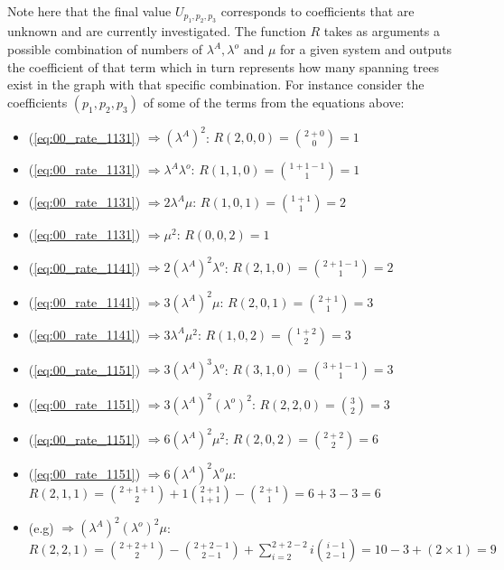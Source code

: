 Note here that the final value \(U_{p_1,p_2,p_3}\) corresponds to coefficients 
that are unknown and are currently investigated. 
The function \(R\) takes as arguments a possible combination of numbers of 
\(\lambda^A, \lambda^o \text{ and } \mu \) for a given system and outputs the 
coefficient of that term which in turn represents how many spanning trees exist 
in the graph with that specific combination. 
For instance consider the coefficients \((p_1,p_2,p_3)\) of some of the terms 
from the equations above:

\begin{multicols}{2}
    \begin{itemize}
        \item (\ref{eq:00_rate_1131}) \( \Rightarrow (\lambda^A)^2\): 
        \(R(2,0,0) = \binom{2+0}{0} = 1\)
        \item (\ref{eq:00_rate_1131}) \( \Rightarrow \lambda^A \lambda^o\): 
        \(R(1,1,0) = \binom{1+1-1}{1} = 1\)
        \item (\ref{eq:00_rate_1131}) \( \Rightarrow 2 \lambda^A \mu\): 
        \(R(1,0,1) = \binom{1+1}{1} = 2\)
        \item (\ref{eq:00_rate_1131}) \( \Rightarrow \mu^2\): \(R(0,0,2) = 1\)
        \item (\ref{eq:00_rate_1141}) \( \Rightarrow 2(\lambda^A)^2 \lambda^o\): 
        \(R(2,1,0) = \binom{2+1-1}{1} = 2\)
        \item (\ref{eq:00_rate_1141}) \( \Rightarrow 3(\lambda^A)^2 \mu\): 
        \(R(2,0,1) = \binom{2+1}{1} = 3\)
        \item (\ref{eq:00_rate_1141}) \( \Rightarrow 3 \lambda^A \mu^2\): 
        \(R(1,0,2) = \binom{1+2}{2} = 3\)
        \item (\ref{eq:00_rate_1151}) \( \Rightarrow 3 (\lambda^A)^3 \lambda^o\): 
        \(R(3,1,0) = \binom{3+1-1}{1} = 3\)
        \item (\ref{eq:00_rate_1151}) \( \Rightarrow 3 (\lambda^A)^2 (\lambda^o)^2 \): 
        \(R(2,2,0) = \binom{3}{2} = 3\)
        \item (\ref{eq:00_rate_1151}) \( \Rightarrow 6 (\lambda^A)^2 \mu ^ 2\): 
        \(R(2,0,2) = \binom{2+2}{2} = 6\)
    \end{itemize}
\end{multicols}

\begin{itemize}
    \item (\ref{eq:00_rate_1151}) \( \Rightarrow 6 (\lambda^A)^2 \lambda^o \mu\): 
    \(R(2,1,1) = \binom{2+1+1}{2} + 1\binom{2+1}{1+1} - \binom{2+1}{1} = 6 + 3 - 3 = 6\)
    \item \small{(e.g)} \( \Rightarrow (\lambda^A)^2 (\lambda^o)^2 \mu\): 
    \(R(2,2,1) = \binom{2+2+1}{2} - \binom{2+2-1}{2-1} + \sum_{i=2}^{2+2-2} 
    i\binom{i-1}{2-1} = 10 - 3 + (2 \times 1) = 9\)
\end{itemize}



